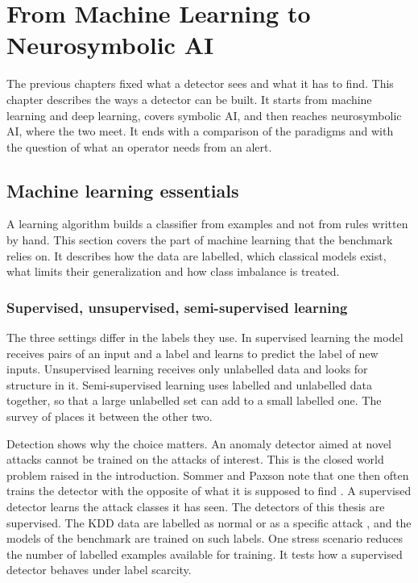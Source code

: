 \chapter{From Machine Learning to Neurosymbolic AI}
\label{ch:learning-paradigms}

The previous chapters fixed what a detector sees and what it has to find.
This chapter describes the ways a detector can be built. It starts from
machine learning and deep learning, covers symbolic AI, and then reaches
neurosymbolic AI, where the two meet. It ends with a comparison of the
paradigms and with the question of what an operator needs from an alert.

\section{Machine learning essentials}
\label{sec:ml-essentials}

A learning algorithm builds a classifier from examples and not from rules
written by hand. This section covers the part of machine learning that the
benchmark relies on. It describes how the data are labelled, which classical
models exist, what limits their generalization and how class imbalance is
treated.

\subsection{Supervised, unsupervised, semi-supervised learning}
\label{sec:supervised-unsupervised}

The three settings differ in the labels they use. In supervised learning the
model receives pairs of an input and a label and learns to predict the label
of new inputs. Unsupervised learning receives only unlabelled data and looks
for structure in it. Semi-supervised learning uses labelled and unlabelled
data together, so that a large unlabelled set can add to a small labelled
one. The survey of \citet{vanengelen2020semisupervised} places it between
the other two.

Detection shows why the choice matters. An anomaly detector aimed at novel
attacks cannot be trained on the attacks of interest. This is the closed world
problem raised in the introduction. Sommer and Paxson note that one then often
trains the detector with the opposite of what it is supposed to find
\citep{sommer2010outside}. A supervised detector learns the attack classes it has seen. The detectors of
this thesis are supervised. The KDD data are labelled as normal
or as a specific attack \citep{tavallaee2009kddcup99}, and the models of the
benchmark are trained on such labels. One stress scenario reduces the number
of labelled examples available for training. It tests how a supervised
detector behaves under label scarcity.

